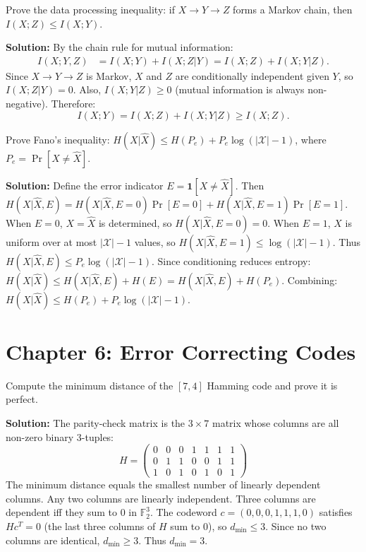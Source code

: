 \begin{exercise}[Intermediate]
Prove the data processing inequality: if $X \to Y \to Z$ forms a Markov chain, then $I(X;Z) \le I(X;Y)$.
\end{exercise}
\textbf{Solution:} By the chain rule for mutual information:
\begin{align}
I(X;Y,Z) &= I(X;Y) + I(X;Z|Y) = I(X;Z) + I(X;Y|Z).
\end{align}
Since $X \to Y \to Z$ is Markov, $X$ and $Z$ are conditionally independent given $Y$, so $I(X;Z|Y) = 0$. Also, $I(X;Y|Z) \ge 0$ (mutual information is always non-negative). Therefore:
\[
I(X;Y) = I(X;Z) + I(X;Y|Z) \ge I(X;Z).
\]

\begin{exercise}[Intermediate]
Prove Fano's inequality: $H(X|\hat{X}) \le H(P_e) + P_e \log(|\mathcal{X}|-1)$, where $P_e = \Pr[X \neq \hat{X}]$.
\end{exercise}
\textbf{Solution:} Define the error indicator $E = \mathbf{1}[X \neq \hat{X}]$. Then $H(X|\hat{X}, E) = H(X|\hat{X}, E=0)\Pr[E=0] + H(X|\hat{X}, E=1)\Pr[E=1]$. When $E=0$, $X = \hat{X}$ is determined, so $H(X|\hat{X}, E=0) = 0$. When $E=1$, $X$ is uniform over at most $|\mathcal{X}|-1$ values, so $H(X|\hat{X}, E=1) \le \log(|\mathcal{X}|-1)$. Thus $H(X|\hat{X}, E) \le P_e \log(|\mathcal{X}|-1)$. Since conditioning reduces entropy: $H(X|\hat{X}) \le H(X|\hat{X}, E) + H(E) = H(X|\hat{X}, E) + H(P_e)$. Combining: $H(X|\hat{X}) \le H(P_e) + P_e \log(|\mathcal{X}|-1)$.

\section{Chapter 6: Error Correcting Codes}

\begin{exercise}[Intermediate]
Compute the minimum distance of the $[7,4]$ Hamming code and prove it is perfect.
\end{exercise}
\textbf{Solution:} The parity-check matrix is the $3 \times 7$ matrix whose columns are all non-zero binary 3-tuples:
\[
H = \begin{pmatrix} 0&0&0&1&1&1&1 \\ 0&1&1&0&0&1&1 \\ 1&0&1&0&1&0&1 \end{pmatrix}
\]
The minimum distance equals the smallest number of linearly dependent columns. Any two columns are linearly independent. Three columns are dependent iff they sum to $0$ in $\mathbb{F}_2^3$. The codeword $c = (0,0,0,1,1,1,0)$ satisfies $Hc^T = 0$ (the last three columns of $H$ sum to $0$), so $d_{\min} \le 3$. Since no two columns are identical, $d_{\min} \ge 3$. Thus $d_{\min} = 3$.

